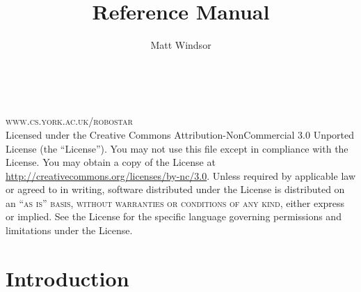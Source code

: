 \documentclass[11pt]{book}
\title{\langname{} Reference Manual}
\author{Matt Windsor}
\begin{document}
\frontmatter

%
%

\begingroup                                                                     
\makeatletter
\thispagestyle{empty} %
\makeatother
\vfill
\endgroup

%
%

\newpage
~\vfill
\thispagestyle{empty}

\noindent \textsc{www.cs.york.ac.uk/robostar}\\

\noindent Licensed under the Creative Commons
Attribution-NonCommercial 3.0 Unported License (the ``License''). You
may not use this file except in compliance with the License. You may
obtain a copy of the License at
\url{http://creativecommons.org/licenses/by-nc/3.0}. Unless required
by applicable law or agreed to in writing, software distributed under
the License is distributed on an \textsc{``as is'' basis, without
  warranties or conditions of any kind}, either express or
implied. See the License for the specific language governing
permissions and limitations under the License.\\


%
%

\usechapterimagefalse
\pagestyle{empty} %
\tableofcontents %
\cleardoublepage %
\pagestyle{fancy} %

%
%

\chapter{Introduction}

\end{document}

